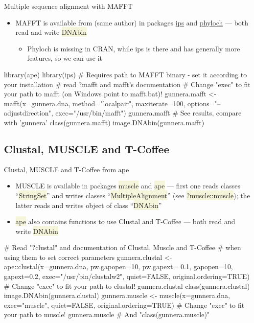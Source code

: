 \documentclass[compress, xelatex, 11pt, xcolor=svgnames, aspectratio=169, url={hyphens, lowtilde}]{beamer}
\renewcommand{\texttt}[1]{\colorbox{Beige}{{\ttfamily #1}}}
\begin{document}
\begin{frame}[fragile]{Multiple sequence alignment with MAFFT}
	\begin{itemize}
		\item MAFFT is available from (same author) in packages \href{https://CRAN.R-project.org/package=ips}{ips} and \href{http://www.christophheibl.de/Rpackages.html}{phyloch} --- both read and write \texttt{DNAbin}
		\begin{itemize}
			\item Phyloch is missing in CRAN, while ips is there and has generally more features, so we can use it
		\end{itemize}
	\end{itemize}
	\begin{spluscode}
    library(ape)
    library(ips)
    # Requires path to MAFFT binary - set it according to your installation
    # read ?mafft and mafft's documentation
    # Change "exec" to fit your path to mafft (on Windows point to mafft.bat)!
    gunnera.mafft <- mafft(x=gunnera.dna, method="localpair", maxiterate=100,
      options="--adjustdirection", exec="/usr/bin/mafft")
    gunnera.mafft # See results, compare with 'gunnera'
    class(gunnera.mafft)
    image.DNAbin(gunnera.mafft)
	\end{spluscode}
\end{frame}

\subsection{Clustal, MUSCLE and T-Coffee}

\begin{frame}[fragile]{Clustal, MUSCLE and T-Coffee from ape}
	\begin{itemize}
		\item MUSCLE is available in packages \texttt{muscle} and \texttt{ape} --- first one reads classes \enquote{\texttt{*StringSet}} and writes classes \enquote{\texttt{*MultipleAlignment}} (see \texttt{?muscle::muscle}); the latter reads and writes object of class \enquote{\texttt{DNAbin}}
		\item \texttt{ape} also contains functions to use Clustal and T-Coffee --- both read and write \texttt{DNAbin}
	\end{itemize}
	\begin{spluscode}
    # Read "?clustal" and documentation of Clustal, Muscle and T-Coffee
    # when using them to set correct parameters
    gunnera.clustal <- ape::clustal(x=gunnera.dna, pw.gapopen=10, pw.gapext=
      0.1, gapopen=10, gapext=0.2, exec="/usr/bin/clustalw2", quiet=FALSE,
      original.ordering=TRUE) # Change "exec" to fit your path to clustal!
    gunnera.clustal
    class(gunnera.clustal)
    image.DNAbin(gunnera.clustal)
    gunnera.muscle <- muscle(x=gunnera.dna, exec="muscle", quiet=FALSE,
      original.ordering=TRUE) # Change "exec" to fit your path to muscle!
    gunnera.muscle # And "class(gunnera.muscle)"
	\end{spluscode}
\end{frame}
\end{document}
